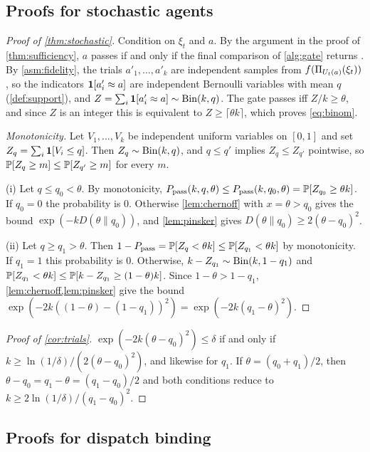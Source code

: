 \subsection{Proofs for stochastic agents}

\begin{proof}[Proof of \cref{thm:stochastic}]
Condition on $\xi_t$ and $a$. By the argument in the proof of \cref{thm:sufficiency}, $a$ passes if and only if the final comparison of \cref{alg:gate} returns \PASS. By \cref{asm:fidelity}, the trials $a'_1,\dots,a'_k$ are independent samples from $f(\Pi_{U_t(a)}(\xi_t))$, so the indicators $\mathbf{1}[a'_i\approx a]$ are independent Bernoulli variables with mean $q$ (\cref{def:support}), and $Z=\sum_i\mathbf{1}[a'_i\approx a]\sim\operatorname{Bin}(k,q)$. The gate passes iff $Z/k\ge\theta$, and since $Z$ is an integer this is equivalent to $Z\ge\lceil\theta k\rceil$, which proves \cref{eq:binom}.

\emph{Monotonicity.} Let $V_1,\dots,V_k$ be independent uniform variables on $[0,1]$ and set $Z_q=\sum_i\mathbf{1}[V_i\le q]$. Then $Z_q\sim\operatorname{Bin}(k,q)$, and $q\le q'$ implies $Z_q\le Z_{q'}$ pointwise, so $\mathbb{P}[Z_q\ge m]\le\mathbb{P}[Z_{q'}\ge m]$ for every $m$.

(i) Let $q\le q_0<\theta$. By monotonicity, $P_{\mathrm{pass}}(k,q,\theta)\le P_{\mathrm{pass}}(k,q_0,\theta)=\mathbb{P}[Z_{q_0}\ge\theta k]$. If $q_0=0$ the probability is $0$. Otherwise \cref{lem:chernoff} with $x=\theta>q_0$ gives the bound $\exp(-kD(\theta\|q_0))$, and \cref{lem:pinsker} gives $D(\theta\|q_0)\ge 2(\theta-q_0)^2$.

(ii) Let $q\ge q_1>\theta$. Then $1-P_{\mathrm{pass}}=\mathbb{P}[Z_q<\theta k]\le\mathbb{P}[Z_{q_1}<\theta k]$ by monotonicity. If $q_1=1$ this probability is $0$. Otherwise, $k-Z_{q_1}\sim\operatorname{Bin}(k,1-q_1)$ and $\mathbb{P}[Z_{q_1}<\theta k]\le\mathbb{P}[k-Z_{q_1}\ge(1-\theta)k]$. Since $1-\theta>1-q_1$, \cref{lem:chernoff,lem:pinsker} give the bound $\exp(-2k((1-\theta)-(1-q_1))^2)=\exp(-2k(q_1-\theta)^2)$.
\end{proof}

\begin{proof}[Proof of \cref{cor:trials}]
$\exp(-2k(\theta-q_0)^2)\le\delta$ if and only if $k\ge\ln(1/\delta)/(2(\theta-q_0)^2)$, and likewise for $q_1$. If $\theta=(q_0+q_1)/2$, then $\theta-q_0=q_1-\theta=(q_1-q_0)/2$ and both conditions reduce to $k\ge2\ln(1/\delta)/(q_1-q_0)^2$.
\end{proof}

\subsection{Proofs for dispatch binding}

